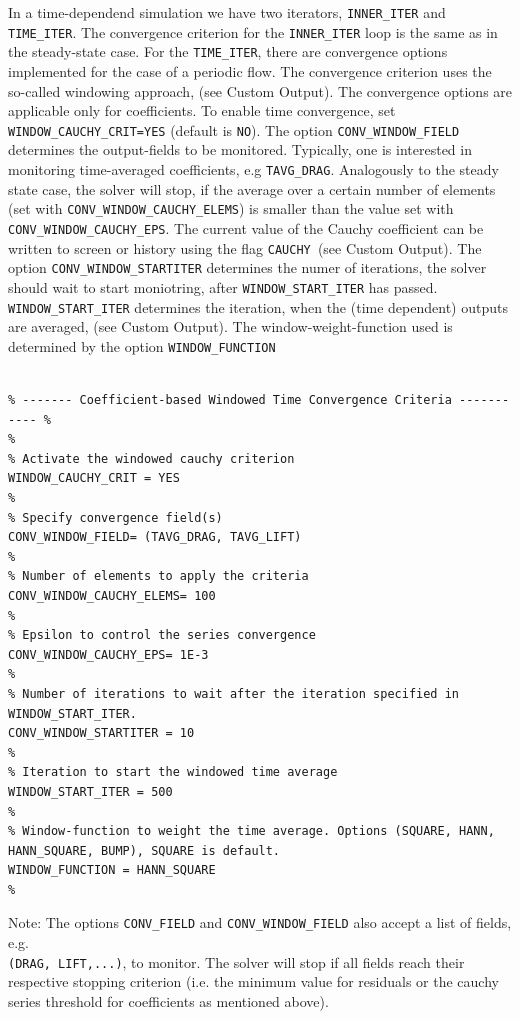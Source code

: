 \documentclass{article}
\begin{document}
In a time-dependend simulation we have two iterators, \verb|INNER_ITER| and \verb|TIME_ITER|. The convergence criterion for the \verb|INNER_ITER| loop is the same as in the steady-state case. For the \verb|TIME_ITER|, there are convergence options implemented for the case of a periodic flow. The convergence criterion uses the so-called windowing approach, (see Custom Output). The convergence options are applicable only for coefficients. To enable time convergence, set \verb|WINDOW_CAUCHY_CRIT=YES| (default is \verb|NO|). The option \verb|CONV_WINDOW_FIELD| determines the output-fields to be monitored. Typically, one is interested in monitoring time-averaged coefficients, e.g \verb|TAVG_DRAG|. Analogously to the steady state case, the solver will stop, if the average over a certain number of elements (set with \verb|CONV_WINDOW_CAUCHY_ELEMS|) is smaller than the value set with \verb|CONV_WINDOW_CAUCHY_EPS|. The current value of the Cauchy coefficient can be written to screen or history using the flag \verb|CAUCHY |(see Custom Output). The option \verb|CONV_WINDOW_STARTITER| determines the numer of iterations, the solver should wait to start moniotring, after \verb|WINDOW_START_ITER| has passed. \verb|WINDOW_START_ITER| determines the iteration, when the (time dependent) outputs are averaged, (see Custom Output). The window-weight-function used is determined by the option \verb|WINDOW_FUNCTION|


\begin{lstlisting}

% ------- Coefficient-based Windowed Time Convergence Criteria ----------- %
%
% Activate the windowed cauchy criterion
WINDOW_CAUCHY_CRIT = YES
%
% Specify convergence field(s)
CONV_WINDOW_FIELD= (TAVG_DRAG, TAVG_LIFT)
%
% Number of elements to apply the criteria
CONV_WINDOW_CAUCHY_ELEMS= 100
%
% Epsilon to control the series convergence
CONV_WINDOW_CAUCHY_EPS= 1E-3
%
% Number of iterations to wait after the iteration specified in  WINDOW_START_ITER.
CONV_WINDOW_STARTITER = 10
%
% Iteration to start the windowed time average
WINDOW_START_ITER = 500
%
% Window-function to weight the time average. Options (SQUARE, HANN, HANN_SQUARE, BUMP), SQUARE is default.
WINDOW_FUNCTION = HANN_SQUARE
%

\end{lstlisting}

Note: The options \verb|CONV_FIELD| and \verb|CONV_WINDOW_FIELD| also accept a list of fields, e.g.\\ \verb|(DRAG, LIFT,...)|, to monitor. The solver will stop if all fields reach their respective stopping criterion (i.e. the minimum value for residuals or the cauchy series threshold for coefficients as mentioned above).
\end{document}
